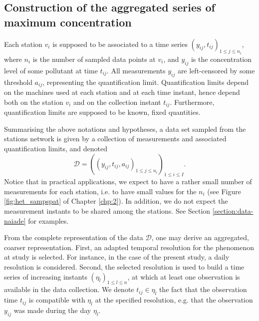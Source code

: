 \subsection{Construction of the aggregated series of  maximum concentration}\label{subsection:data:collection}

Each station $v_i$ is supposed to be associated to a time series $(y_{ij},t_{ij})_{1\leq j\leq n_i}$, where $n_i$ is the number of sampled data points at $v_i$, and $y_{ij}$ is the concentration level of some pollutant at time $t_{ij}$. All measurements $y_{ij}$ are left-censored by some threshold $a_{ij}$, representing the quantification limit. Quantification limits depend on the machines used at each station and at each time instant, hence depend both on the station $v_i$ and on the collection instant $t_{ij}$. Furthermore, quantification limits are supposed to be known, fixed quantities. 

Summarising the above notations and hypotheses, a data set sampled from the stations network is given by a collection of measurements and associated quantification limits, and denoted
\begin{equation*}
 \mathcal{D}=\left(\left(y_{ij},t_{ij}, a_{ij}\right)_{1\leq j\leq n_i}\right)_{1\leq i\leq I}.   
\end{equation*}
Notice that in practical applications, we expect to have a rather small number of measurements for each station, i.e. to have small values for the $n_i$ (see Figure \ref{fig:het_sampspat} of Chapter \ref{chp:2}). In addition, we do not expect the measurement instants to be shared among the stations. See Section \ref{section:data-naiade} for examples. 


From the complete representation of the data $\mathcal{D}$, one may derive an aggregated, coarser representation. First, an adapted temporal resolution for the phenomenon at study is selected. For instance, in the case of the present study, a daily resolution is considered. Second, the selected resolution is used to build a time series of increasing instants $(\eta_l)_{1\leq l\leq n}$, at which at least one observation is available in the data collection. We denote $t_{ij}\in\eta_l$ the fact that the observation time $t_{ij}$ is compatible with $\eta_l$ at the specified resolution, e.g. that the observation $y_{ij}$ was made during the day $\eta_l$. 

